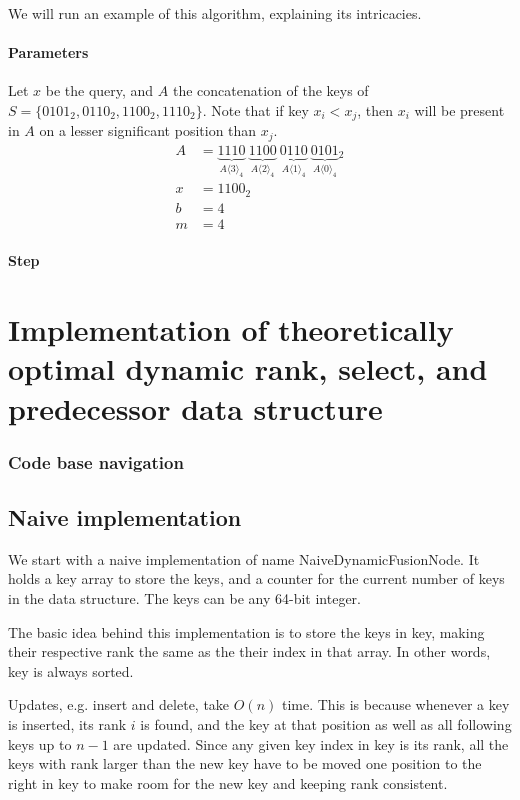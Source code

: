 We will run an example of this algorithm, explaining its intricacies.

\subsubsection{Parameters}

Let $x$ be the query, and $A$ the concatenation of the keys of $S = \{0101_2, 0110_2, 1100_2, 1110_2 \}$. Note that if key $x_i < x_j$, then $x_i$ will be present in $A$ on a lesser significant position than $x_j$.
\begin{align*}
    A &= \underbrace{1110}_{A\langle 3 \rangle_4}\ \underbrace{1100}_{A\langle 2 \rangle_4}\ \underbrace{0110}_{A\langle 1\rangle_4}\ \underbrace{0101}_{A\langle 0 \rangle_4}{}_2 \\
    x &= 1100_2 \\
    b &= 4 \\
    m &= 4
\end{align*}

\subsubsection{Step}



\chapter{Implementation of theoretically optimal dynamic rank, select, and predecessor data structure}

\subsection{Code base navigation}

\section{Naive implementation}
We start with a naive implementation of name {\ttfamily NaiveDynamicFusionNode}. It holds a {\ttfamily key} array to store the keys, and a counter for the current number of keys in the data structure. The keys can be any 64-bit integer.

The basic idea behind this implementation is to store the keys in {\ttfamily key}, making their respective rank the same as the their index in that array. In other words, {\ttfamily key} is always sorted.

Updates, e.g. insert and delete, take $O(n)$ time. This is because whenever a key is inserted, its rank $i$ is found, and the key at that position as well as all following keys up to $n-1$ are updated. Since any given key index in {\ttfamily key} is its rank, all the keys with rank larger than the new key have to be moved one position to the right in {\ttfamily key} to make room for the new key and keeping rank consistent.


